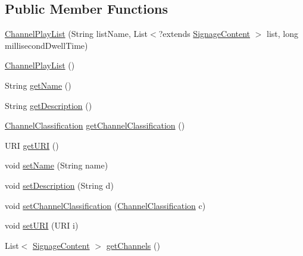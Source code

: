 \subsection*{Public Member Functions}
\begin{DoxyCompactItemize}
\item 
\hyperlink{classgov_1_1fnal_1_1ppd_1_1dd_1_1channel_1_1ChannelPlayList_a9235b6c790a7ee1587b5a3ae04afc8e9}{Channel\-Play\-List} (String list\-Name, List$<$?extends \hyperlink{interfacegov_1_1fnal_1_1ppd_1_1dd_1_1signage_1_1SignageContent}{Signage\-Content} $>$ list, long millisecond\-Dwell\-Time)
\item 
\hyperlink{classgov_1_1fnal_1_1ppd_1_1dd_1_1channel_1_1ChannelPlayList_af6a62dd284fed342597292000aece6c3}{Channel\-Play\-List} ()
\item 
String \hyperlink{classgov_1_1fnal_1_1ppd_1_1dd_1_1channel_1_1ChannelPlayList_a1c2d3e0fcb9cee5cad06dc3d7bdb96e9}{get\-Name} ()
\item 
String \hyperlink{classgov_1_1fnal_1_1ppd_1_1dd_1_1channel_1_1ChannelPlayList_a1b1c73554407ef5d5f8f7f3b239a1f12}{get\-Description} ()
\item 
\hyperlink{classgov_1_1fnal_1_1ppd_1_1dd_1_1changer_1_1ChannelClassification}{Channel\-Classification} \hyperlink{classgov_1_1fnal_1_1ppd_1_1dd_1_1channel_1_1ChannelPlayList_a8e1ce06c00064455483d664b4d0fef17}{get\-Channel\-Classification} ()
\item 
U\-R\-I \hyperlink{classgov_1_1fnal_1_1ppd_1_1dd_1_1channel_1_1ChannelPlayList_a6f2e7a1655fb99a2e711c225912d2d79}{get\-U\-R\-I} ()
\item 
void \hyperlink{classgov_1_1fnal_1_1ppd_1_1dd_1_1channel_1_1ChannelPlayList_add9a4e4bdd0370b68ed3190ba1677070}{set\-Name} (String name)
\item 
void \hyperlink{classgov_1_1fnal_1_1ppd_1_1dd_1_1channel_1_1ChannelPlayList_a1321936810234139f911c5a1c7d6a7af}{set\-Description} (String d)
\item 
void \hyperlink{classgov_1_1fnal_1_1ppd_1_1dd_1_1channel_1_1ChannelPlayList_a145fde3f59f8025e8c79117024d5d3ab}{set\-Channel\-Classification} (\hyperlink{classgov_1_1fnal_1_1ppd_1_1dd_1_1changer_1_1ChannelClassification}{Channel\-Classification} c)
\item 
void \hyperlink{classgov_1_1fnal_1_1ppd_1_1dd_1_1channel_1_1ChannelPlayList_a7bb16de560ccbd745ee6a4f12e7756ae}{set\-U\-R\-I} (U\-R\-I i)
\item 
List$<$ \hyperlink{interfacegov_1_1fnal_1_1ppd_1_1dd_1_1signage_1_1SignageContent}{Signage\-Content} $>$ \hyperlink{classgov_1_1fnal_1_1ppd_1_1dd_1_1channel_1_1ChannelPlayList_a4a45d0e640ddc2548f37bd6c1c997f11}{get\-Channels} ()

\end{DoxyCompactItemize}
